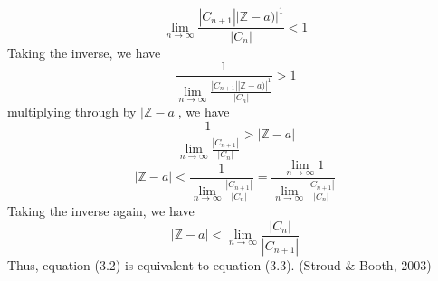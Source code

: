 \documentclass[a4paper, 12pt]{report}
\begin{document}
{\begin{equation*}
\end{equation*}
\begin{equation*}
\lim_{n\rightarrow\infty}\frac{|C_{n+1}||\mathbb{Z} - a)|^{1}}{|C_{n}|} < 1
\end{equation*}
Taking the inverse, we have
\begin{equation*}
\frac{1}{\lim_{n\rightarrow\infty}\frac{|C_{n+1}||\mathbb{Z} - a)|^{1}}{|C_{n}|}} > 1
\end{equation*}
multiplying through by $|\mathbb{Z} - a|$, we have
\begin{equation*}
\frac{1}{\lim_{n\rightarrow\infty}\frac{|C_{n+1}|}{|C_{n}|}} > |\mathbb{Z} - a|
\end{equation*}
\begin{equation*}
|\mathbb{Z} - a| < \frac{1}{\lim_{n\rightarrow\infty}\frac{|C_{n+1}|}{|C_{n}|}} = \frac{\lim_{n\rightarrow\infty}1}{\lim_{n\rightarrow\infty}\frac{|C_{n+1}|}{|C_{n}|}}
\end{equation*}
Taking the inverse again, we have
\begin{equation*}
|\mathbb{Z} - a| < \lim_{n\rightarrow\infty}\frac{|C_{n}|}{|C_{n+1}|}
\end{equation*}
Thus, equation (3.2) is equivalent to equation (3.3). (Stroud \& Booth, 2003)
}
\end{document}
